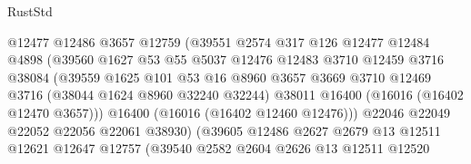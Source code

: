 \begin{lexlean}{RustStd}
\begin{coremodule}
                                @12477
                                @12486
                                @3657
                                @12759
                                (@39551
                                  @2574
                                  @317
                                  @126
                                  @12477
                                  @12484
                                  @4898
                                  (@39560
                                    @1627
                                    @53
                                    @55
                                    @5037
                                    @12476
                                    @12483
                                    @3710
                                    @12459
                                    @3716
                                    @38084
                                    (@39559
                                      @1625
                                      @101
                                      @53
                                      @16
                                      @8960
                                      @3657
                                      @3669
                                      @3710
                                      @12469
                                      @3716
                                      (@38044 @1624 @8960 @32240 @32244)
                                      @38011
                                      @16400
                                      (@16016 (@16402 @12470 @3657)))
                                    @16400
                                    (@16016 (@16402 @12460 @12476)))
                                  @22046
                                  @22049
                                  @22052
                                  @22056
                                  @22061
                                  @38930)
                                (@39605
                                  @12486
                                  @2627
                                  @2679
                                  @13
                                  @12511
                                  @12621
                                  @12647
                                  @12757
                                  (@39540
                                    @2582
                                    @2604
                                    @2626
                                    @13
                                    @12511
                                    @12520

\end{coremodule}
\end{lexlean}
